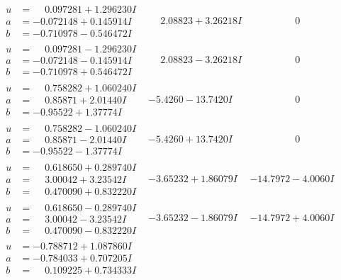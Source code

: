 \documentclass[1p]{elsarticle_modified}
\theoremstyle{definition}
\begin{document}
$$\begin{array}{c|c|c}
\begin{aligned}
u &= \phantom{-}0.097281 + 1.296230 I \\
a &= -0.072148 + 0.145914 I \\
b &= -0.710978 - 0.546472 I\end{aligned}
 & \phantom{-}2.08823 + 3.26218 I & \phantom{-0.000000 } 0 \\ \hline\begin{aligned}
u &= \phantom{-}0.097281 - 1.296230 I \\
a &= -0.072148 - 0.145914 I \\
b &= -0.710978 + 0.546472 I\end{aligned}
 & \phantom{-}2.08823 - 3.26218 I & \phantom{-0.000000 } 0 \\ \hline\begin{aligned}
u &= \phantom{-}0.758282 + 1.060240 I \\
a &= \phantom{-}0.85871 + 2.01440 I \\
b &= -0.95522 + 1.37774 I\end{aligned}
 & -5.4260 - 13.7420 I & \phantom{-0.000000 } 0 \\ \hline\begin{aligned}
u &= \phantom{-}0.758282 - 1.060240 I \\
a &= \phantom{-}0.85871 - 2.01440 I \\
b &= -0.95522 - 1.37774 I\end{aligned}
 & -5.4260 + 13.7420 I & \phantom{-0.000000 } 0 \\ \hline\begin{aligned}
u &= \phantom{-}0.618650 + 0.289740 I \\
a &= \phantom{-}3.00042 + 3.23542 I \\
b &= \phantom{-}0.470090 + 0.832220 I\end{aligned}
 & -3.65232 + 1.86079 I & -14.7972 - 4.0060 I \\ \hline\begin{aligned}
u &= \phantom{-}0.618650 - 0.289740 I \\
a &= \phantom{-}3.00042 - 3.23542 I \\
b &= \phantom{-}0.470090 - 0.832220 I\end{aligned}
 & -3.65232 - 1.86079 I & -14.7972 + 4.0060 I \\ \hline\begin{aligned}
u &= -0.788712 + 1.087860 I \\
a &= -0.784033 + 0.707205 I \\
b &= \phantom{-}0.109225 + 0.734333 I\end{aligned}

\end{array}$$
\end{document}
